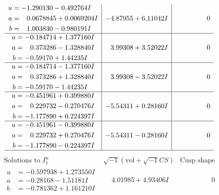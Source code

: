 \documentclass[1p]{elsarticle_modified}
\theoremstyle{definition}
\newcommand{\I}{\sqrt{-1}}
\begin{document}
$$\begin{array}{c|c|c}
\begin{aligned}
u &= -1.290130 - 0.492764 I \\
a &= \phantom{-}0.0678845 + 0.0069204 I \\
b &= \phantom{-}1.003830 - 0.980191 I\end{aligned}
 & -4.87955 + 6.11042 I & \phantom{-0.000000 } 0 \\ \hline\begin{aligned}
u &= -0.184714 + 1.377160 I \\
a &= \phantom{-}0.373286 - 1.328840 I \\
b &= -0.59170 + 1.44235 I\end{aligned}
 & \phantom{-}3.99308 + 3.52022 I & \phantom{-0.000000 } 0 \\ \hline\begin{aligned}
u &= -0.184714 - 1.377160 I \\
a &= \phantom{-}0.373286 + 1.328840 I \\
b &= -0.59170 - 1.44235 I\end{aligned}
 & \phantom{-}3.99308 - 3.52022 I & \phantom{-0.000000 } 0 \\ \hline\begin{aligned}
u &= -0.451961 + 0.399880 I \\
a &= \phantom{-}0.229732 - 0.270476 I \\
b &= -1.177890 + 0.224397 I\end{aligned}
 & -5.54311 + 0.28160 I & \phantom{-0.000000 } 0 \\ \hline\begin{aligned}
u &= -0.451961 - 0.399880 I \\
a &= \phantom{-}0.229732 + 0.270476 I \\
b &= -1.177890 - 0.224397 I\end{aligned}
 & -5.54311 - 0.28160 I & \phantom{-0.000000 } 0\\
 \hline 
 \end{array}$$\newpage$$\begin{array}{c|c|c}  
\text{Solutions to }I^u_{1}& \I (\text{vol} + \sqrt{-1}CS) & \text{Cusp shape}\\
 \hline 
\begin{aligned}
u &= -0.597938 + 1.273550 I \\
a &= -0.28168 - 1.51181 I \\
b &= -0.781362 + 1.161210 I\end{aligned}
 & \phantom{-}4.01985 + 4.93406 I & \phantom{-0.000000 } 0 \\ \hline\begin{aligned}

\end{aligned}
\end{array}$$
\end{document}
